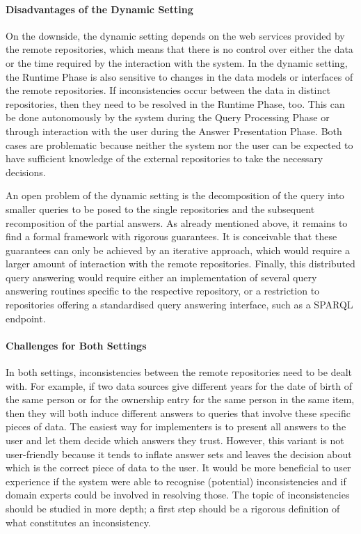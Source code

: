 \paragraph{Disadvantages of the Dynamic Setting}

On the downside, the dynamic setting depends on the web services provided by the remote repositories,
which means that there is no control over either the data or the time required
by the interaction with the system.
In the dynamic setting, the Runtime Phase is also sensitive to changes in the data models
or interfaces of the remote repositories.
If inconsistencies occur between the data in distinct repositories,
then they need to be resolved in the Runtime Phase, too.
This can be done autonomously by the system during the Query Processing Phase
or through interaction with the user during the Answer Presentation Phase.
Both cases are problematic because neither the system nor the user
can be expected to have sufficient knowledge of the external repositories
to take the necessary decisions.

An open problem of the dynamic setting is the decomposition of the query
into smaller queries to be posed to the single repositories
and the subsequent recomposition of the partial answers.
As already mentioned above, it remains to find a
formal framework with rigorous guarantees.
It is conceivable that these guarantees can only be achieved by an iterative approach,
which would require a larger amount of interaction with the remote repositories.
Finally, this distributed query answering would require either an implementation
of several query answering routines specific to the respective repository,
or a restriction to repositories offering a standardised query answering interface,
such as a \gls{SPARQL} endpoint.

\paragraph{Challenges for Both Settings}

In both settings, inconsistencies between the remote repositories need to be dealt with.
For example, if two data sources give different years for the date of birth of the same person
or for the ownership entry for the same person in the same item,
then they will both induce different answers to queries that involve these specific
pieces of data.
The easiest way for implementers is to present all answers to the user
and let them decide which answers they trust.
However, this variant is not user-friendly because it tends to inflate answer sets
and leaves the decision about which is the correct piece of data to the user.
It would be more beneficial to user experience 
if the system were able to recognise (potential) inconsistencies
and if domain experts could be involved in resolving those.
The topic of inconsistencies should be studied in more depth;
a first step should be a rigorous definition of what constitutes an inconsistency.

